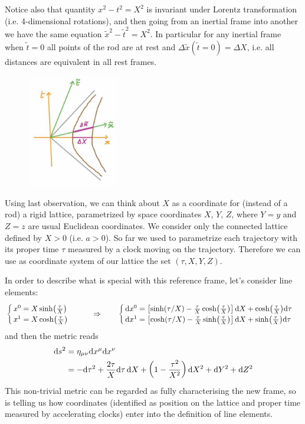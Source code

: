 \documentclass[../main/main.tex]{subfiles}
\begin{document}
Notice also that quantity $x^2-t^2=X^2$ is invariant under Lorentz transformation (i.e. 4-dimensional rotations), and then going from an inertial frame into another we have the same equation $\tilde x^2-\tilde t^2=X^2$. In particular for any inertial frame when $\tilde t=0$ all points of the rod are at rest and $\Delta \tilde x(\tilde t=0)=\Delta X$, i.e. all distances are equivalent in all rest frames. 
\begin{figure}[H]
\centering
\includegraphics[width=4cm]{../img/equivalence-rest-frames.jpg}
\end{figure}

Using last observation, we can think about $X$ as a coordinate for (instead of a rod) a rigid lattice, parametrized by space coordinates $X$, $Y$, $Z$, where $Y=y$ and $Z=z$ are usual Euclidean coordinates. We consider only the connected lattice defined by $X>0$ (i.e. $a>0$).
So far we used to parametrize each trajectory with its proper time $\tau$ measured by a clock moving on the trajectory. Therefore we can use as coordinate system of our lattice the set $(\tau,X,Y,Z)$. 

In order to describe what is special with this reference frame, let's consider line elements:
\[\begin{cases}
x^0=X\sinh(\frac\tau X)\\
x^1=X\cosh(\frac\tau X)
\end{cases}
\qquad\Rightarrow\qquad
\begin{cases}
\textup{d} x^0=\left[\sinh(\tau/X)-\frac\tau X\cosh(\frac\tau X)\right]\textup{d} X+\cosh(\frac\tau X)\textup{d}\tau\\
\textup{d} x^1=\left[\cosh(\tau/X)-\frac\tau X\sinh(\frac\tau X)\right]\textup{d} X+\sinh(\frac\tau X)\textup{d}\tau
\end{cases}\]
and then the metric reads
\begin{align}\label{eqn:Rindler-metric-tau}
\textup{d} s^2&=\eta_{\mu\nu}\textup{d} x^\mu\textup{d} x^\nu\\
&=-\textup{d}\tau^2+\frac{2\tau}{X}\textup{d}\tau\,\textup{d} X+\left(1-\frac{\tau^2}{X^2}\right)\textup{d} X^2+\textup{d} Y^2+\textup{d} Z^2
\end{align}
This non-trivial metric can be regarded as fully characterising the new frame, so is telling us how coordinates (identified as position on the lattice and proper time measured by accelerating clocks) enter into the definition of line elements. 
\end{document}
